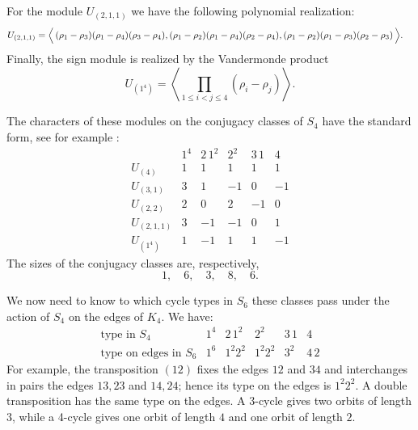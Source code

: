\documentclass[12pt,reqno]{amsart}
\begin{document}
For the module $U_{(2,1,1)}$ we have the following polynomial realization:
$$
\begin{aligned}
U_{(2,1,1)}
=
\Bigl\langle\,
&(\rho_1-\rho_3)(\rho_1-\rho_4)(\rho_3-\rho_4),(\rho_1-\rho_2)(\rho_1-\rho_4)(\rho_2-\rho_4),(\rho_1-\rho_2)(\rho_1-\rho_3)(\rho_2-\rho_3)
\,\Bigr\rangle.
\end{aligned}
$$
Finally, the sign module is realized by the Vandermonde product
$$
U_{(1^4)}
=
\left\langle
\prod_{1\le i<j\le4}(\rho_i-\rho_j)
\right\rangle.
$$

\medskip

The characters of these modules on the conjugacy classes of $S_4$ have the
standard form, see for example \cite[\S 2.3]{FH}:
$$
\begin{array}{c|ccccc}
 & 1^4 & 2\,1^2 & 2^2 & 3\,1 & 4\\
\hline
U_{(4)}       & 1 & 1  & 1  & 1  & 1\\
U_{(3,1)}     & 3 & 1  & -1 & 0  & -1\\
U_{(2,2)}     & 2 & 0  & 2  & -1 & 0\\
U_{(2,1,1)}   & 3 & -1 & -1 & 0  & 1\\
U_{(1^4)}     & 1 & -1 & 1  & 1  & -1
\end{array}
$$
The sizes of the conjugacy classes are, respectively,
$$
1,\quad 6,\quad 3,\quad 8,\quad 6.
$$

We now need to know to which cycle types in $S_6$ these classes pass under
the action of $S_4$ on the edges of $K_4$. We have:
$$
\begin{array}{c|ccccc}
\text{type in }S_4      & 1^4 & 2\,1^2 & 2^2 & 3\,1 & 4\\
\hline
\text{type on edges in }S_6
& 1^6 & 1^2 2^2 & 1^2 2^2 & 3^2 & 4\,2
\end{array}
$$
For example, the transposition $(12)$ fixes the edges $12$ and $34$ and
interchanges in pairs the edges $13,23$ and $14,24$; hence its type on the
edges is $1^2 2^2$.
A double transposition has the same type on the edges. A 3-cycle gives two
orbits of length $3$, while a 4-cycle gives one orbit of length $4$ and one
orbit of length $2$.
\end{document}
